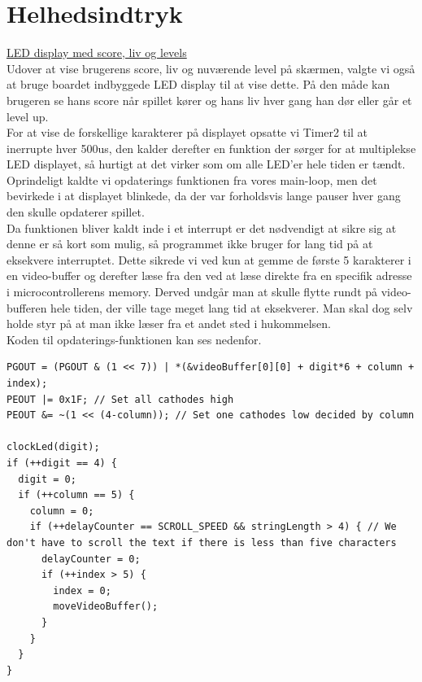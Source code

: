 		

\section{Helhedsindtryk}


\underline{LED display med score, liv og levels}\\

Udover at vise brugerens score, liv og nuværende level på skærmen, valgte vi også at bruge boardet indbyggede LED display til at vise dette. På den måde kan brugeren se hans score når spillet kører og hans liv hver gang han dør eller går et level up. \\
For at vise de forskellige karakterer på displayet opsatte vi Timer2 til at inerrupte hver 500us, den kalder derefter en funktion der sørger for at  multiplekse LED displayet, så hurtigt at det virker som om alle LED'er hele tiden er tændt. Oprindeligt kaldte vi opdaterings funktionen fra vores main-loop, men det bevirkede i at displayet blinkede, da der var forholdsvis lange pauser hver gang den skulle opdaterer spillet. \\

Da funktionen bliver kaldt inde i et interrupt er det nødvendigt at sikre sig at denne er så kort som mulig, så programmet ikke bruger for lang tid på at eksekvere interruptet. Dette sikrede vi ved kun at gemme de første 5 karakterer i en video-buffer og derefter læse fra den ved at læse direkte fra en specifik adresse i microcontrollerens memory. Derved undgår man at skulle flytte rundt på video-bufferen hele tiden, der ville tage meget lang tid at eksekverer. Man skal dog selv holde styr på at man ikke læser fra et andet sted i hukommelsen. \\

Koden til opdaterings-funktionen kan ses nedenfor.

\begin{lstlisting}[frame=single]
PGOUT = (PGOUT & (1 << 7)) | *(&videoBuffer[0][0] + digit*6 + column + index);
PEOUT |= 0x1F; // Set all cathodes high
PEOUT &= ~(1 << (4-column)); // Set one cathodes low decided by column

clockLed(digit);
if (++digit == 4) {
  digit = 0;
  if (++column == 5) {
    column = 0;
	if (++delayCounter == SCROLL_SPEED && stringLength > 4) { // We don't have to scroll the text if there is less than five characters
	  delayCounter = 0;				
	  if (++index > 5) {
        index = 0;
		moveVideoBuffer();
	  }
	}
  }
}
\end{lstlisting}

